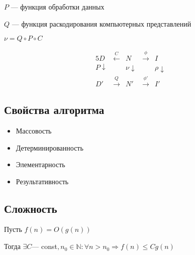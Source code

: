 \documentclass{article}
\begin{document}
$P$ --- функция обработки данных

$Q$ --- функция раскодирования компьютерных представлений

$\nu = Q \circ P \circ C$

\begin{alignat*}{5}
	D & \stackrel{C}{\longleftarrow} & N & \stackrel{\phi}{\longrightarrow} & I \\
	P \downarrow & & \nu \downarrow & & \rho \downarrow \\
	D' & \stackrel{Q}{\longrightarrow} & N' & \stackrel{\phi'}{\longrightarrow} & I'
\end{alignat*}

\subsection{Свойства алгоритма}

\begin{itemize}
	\item Массовость
	\item Детерминированность
	\item Элементарность
	\item Результативность
\end{itemize}

\subsection{Сложность}

Пусть $f(n) = O(g(n))$

Тогда $\exists C$--- const$, n_0 \in \mathbb{N} : \forall n > n_0 \Rightarrow f(n) \le C g(n)$
\end{document}
